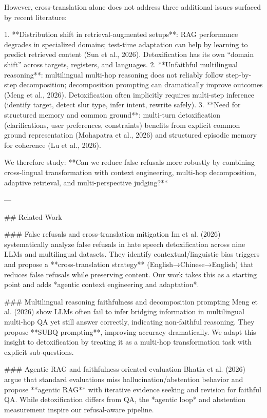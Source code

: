However, cross-translation alone does not address three additional issues surfaced by recent literature:

1. **Distribution shift in retrieval-augmented setups**: RAG performance degrades in specialized domains; test-time adaptation can help by learning to predict retrieved content (Sun et al., 2026). Detoxification has its own “domain shift” across targets, registers, and languages.
2. **Unfaithful multilingual reasoning**: multilingual multi-hop reasoning does not reliably follow step-by-step decomposition; decomposition prompting can dramatically improve outcomes (Meng et al., 2026). Detoxification often implicitly requires multi-step inference (identify target, detect slur type, infer intent, rewrite safely).
3. **Need for structured memory and common ground**: multi-turn detoxification (clarifications, user preferences, constraints) benefits from explicit common ground representation (Mohapatra et al., 2026) and structured episodic memory for coherence (Lu et al., 2026).

We therefore study: **Can we reduce false refusals more robustly by combining cross-lingual transformation with context engineering, multi-hop decomposition, adaptive retrieval, and multi-perspective judging?**

---

## Related Work  

### False refusals and cross-translation mitigation  
Im et al. (2026) systematically analyze false refusals in hate speech detoxification across nine LLMs and multilingual datasets. They identify contextual/linguistic bias triggers and propose a **cross-translation strategy** (English→Chinese→English) that reduces false refusals while preserving content. Our work takes this as a starting point and adds *agentic context engineering and adaptation*.

### Multilingual reasoning faithfulness and decomposition prompting  
Meng et al. (2026) show LLMs often fail to infer bridging information in multilingual multi-hop QA yet still answer correctly, indicating non-faithful reasoning. They propose **SUBQ prompting**, improving accuracy dramatically. We adapt this insight to detoxification by treating it as a multi-hop transformation task with explicit sub-questions.

### Agentic RAG and faithfulness-oriented evaluation  
Bhatia et al. (2026) argue that standard evaluations miss hallucination/abstention behavior and propose **agentic RAG** with iterative evidence seeking and revision for faithful QA. While detoxification differs from QA, the *agentic loop* and abstention measurement inspire our refusal-aware pipeline.

